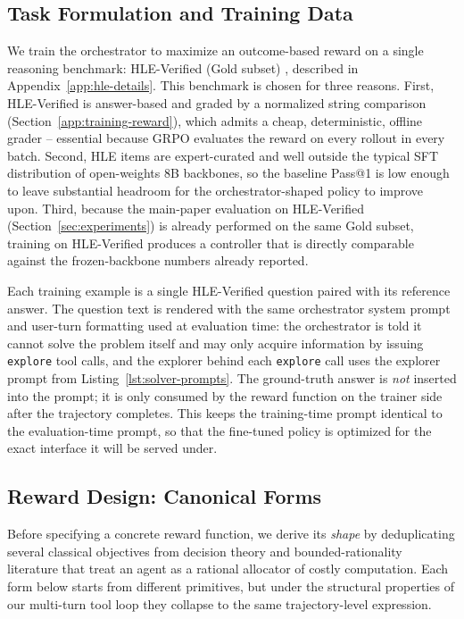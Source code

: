\subsection{Task Formulation and Training Data}
\label{app:training-task}

We train the orchestrator to maximize an outcome-based reward on a single reasoning benchmark: HLE-Verified (Gold subset) \citep{hle_verified_paper,hle_verified_dataset_hf}, described in Appendix~\ref{app:hle-details}. This benchmark is chosen for three reasons. First, HLE-Verified is answer-based and graded by a normalized string comparison (Section~\ref{app:training-reward}), which admits a cheap, deterministic, offline grader -- essential because GRPO evaluates the reward on every rollout in every batch. Second, HLE items are expert-curated and well outside the typical SFT distribution of open-weights 8B backbones, so the baseline Pass@1 is low enough to leave substantial headroom for the orchestrator-shaped policy to improve upon. Third, because the main-paper evaluation on HLE-Verified (Section~\ref{sec:experiments}) is already performed on the same Gold subset, training on HLE-Verified produces a controller that is directly comparable against the frozen-backbone \our{} numbers already reported.

Each training example is a single HLE-Verified question paired with its reference answer. The question text is rendered with the same orchestrator system prompt and user-turn formatting used at evaluation time: the orchestrator is told it cannot solve the problem itself and may only acquire information by issuing \texttt{explore} tool calls, and the explorer behind each \texttt{explore} call uses the explorer prompt from Listing~\ref{lst:solver-prompts}. The ground-truth answer is \emph{not} inserted into the prompt; it is only consumed by the reward function on the trainer side after the trajectory completes. This keeps the training-time prompt identical to the evaluation-time prompt, so that the fine-tuned policy is optimized for the exact interface it will be served under.

\subsection{Reward Design: Canonical Forms}
\label{app:training-reward-forms}

Before specifying a concrete reward function, we derive its \emph{shape} by deduplicating several classical objectives from decision theory and bounded-rationality literature that treat an agent as a rational allocator of costly computation. Each form below starts from different primitives, but under the structural properties of our multi-turn tool loop they collapse to the same trajectory-level expression.

